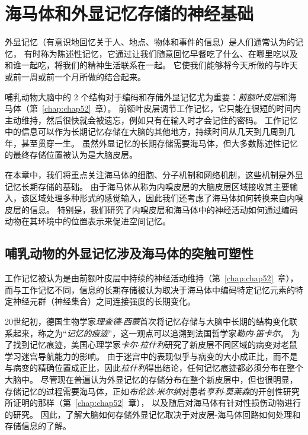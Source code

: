 \chapter{海马体和外显记忆存储的神经基础} \label{chap:chap54}

外显记忆（有意识地回忆关于人、地点、物体和事件的信息）是人们通常认为的记忆，
有时称为陈述性记忆，它通过让我们随意回忆早餐吃了什么、在哪里吃以及和谁一起吃，将我们的精神生活联系在一起。
它使我们能够将今天所做的与昨天或前一周或前一个月所做的结合起来。


哺乳动物大脑中的 2 个结构对于编码和存储外显记忆尤为重要：\textit{前额叶皮层}和海马体（第~\ref{chap:chap52}~章）。
前额叶皮层调节工作记忆，它只能在很短的时间内主动维持，然后很快就会被遗忘，例如只有在输入时才会记住的密码。
工作记忆中的信息可以作为长期记忆存储在大脑的其他地方，持续时间从几天到几周到几年，甚至贯穿一生。
虽然外显记忆的长期存储需要海马体，但大多数陈述性记忆的最终存储位置被认为是大脑皮层。


在本章中，我们将重点关注海马体的细胞、分子机制和网络机制，这些机制是外显记忆长期存储的基础。
由于海马体从称为内嗅皮层的大脑皮层区域接收其主要输入，该区域处理多种形式的感觉输入，因此我们还考虑了海马体如何转换来自内嗅皮层的信息。
特别是，我们研究了内嗅皮层和海马体中的神经活动如何通过编码动物在其环境中的位置表示来促进空间记忆。



\section{哺乳动物的外显记忆涉及海马体的突触可塑性}

工作记忆被认为是由前额叶皮层中持续的神经活动维持（第~\ref{chap:chap52}~章），而与工作记忆不同，信息的长期存储被认为取决于海马体中编码特定记忆元素的特定神经元群（神经集合）之间连接强度的长期变化。


20世纪初，德国生物学家\textit{理查德$\cdot$西蒙}首次将记忆存储与大脑中长期的结构变化联系起来，称之为“\textit{记忆的痕迹}”，这一观点可以追溯到法国哲学家\textit{勒内$\cdot$笛卡尔}。
为了找到记忆痕迹，美国心理学家\textit{卡尔$\cdot$拉什利}研究了新皮层不同区域的病变对老鼠学习迷宫导航能力的影响。
由于迷宫中的表现似乎与病变的大小成正比，而不是与病变的精确位置成正比，因此\textit{拉什利}得出结论，任何记忆痕迹都必须分布在整个大脑中。
尽管现在普遍认为外显记忆的存储分布在整个新皮层中，但也很明显，存储记忆的过程需要海马体，正如\textit{布伦达$\cdot$米尔纳}对患者\textit{亨利$\cdot$莫莱森}的开创性研究所证明的那样（第~\ref{chap:chap52}~章），
以及随后对海马体有针对性损伤动物进行的研究。
因此，了解大脑如何存储外显记忆取决于对皮层-海马体回路如何处理和存储信息的了解。


